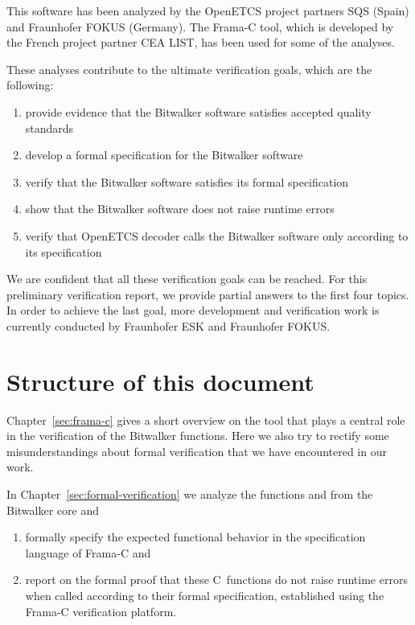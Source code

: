 This software has been analyzed by the OpenETCS project partners SQS (Spain)
and Fraunhofer FOKUS (Germany).
The Frama-C tool, which is developed by the French project partner {CEA LIST},
has been used for some of the analyses.

\clearpage

These analyses contribute to
the ultimate verification goals, which are the following:

\begin{enumerate}
\item provide evidence that the Bitwalker software satisfies 
      accepted quality standards
\item develop a formal specification for the Bitwalker software
\item verify that the Bitwalker software satisfies its formal specification
\item show that the Bitwalker software does not raise runtime errors
\item verify that OpenETCS decoder calls the Bitwalker software only
      according to its specification
\end{enumerate}

We are confident that all these verification goals can be reached.
For this preliminary verification report,
we provide partial answers to the first four topics.
In order to achieve the last goal, more development and verification
work is currently conducted by Fraunhofer ESK and Fraunhofer FOKUS. 

\section*{Structure of this document}

Chapter~\ref{sec:frama-c} gives a short overview on the \framacwp tool
that plays a central role in the verification of the Bitwalker functions.
Here we also try to rectify some misunderstandings about formal verification
that we have encountered in our work.

In Chapter~\ref{sec:formal-verification} we analyze
the functions \peek and \poke from the Bitwalker core and
\begin{enumerate}
\item formally specify the
      expected functional behavior in the \acsl specification language of {Frama-C}
      and
\item report on the formal proof 
	that these
      C~functions do not raise runtime errors when called according to their
      formal specification, established using 
      the {Frama-C} verification platform.
\end{enumerate}

